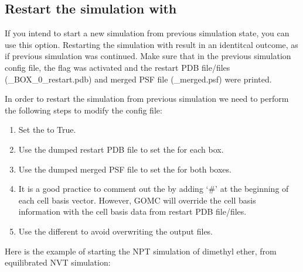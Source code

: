 \documentclass[letterpaper,10pt,english]{sphinxmanual}
\begin{document}
\subsection{Restart the simulation with }
\label{\detokenize{howto:restart-the-simulation-with-restart}}
If you intend to start a new simulation from previous simulation state, you can use this option. Restarting the simulation with   result in
an identitcal outcome, as if previous simulation was continued.
Make sure that in the previous simulation config file, the flag  was activated and the restart PDB file/files (\_BOX\_0\_restart.pdb)
and merged PSF file (\_merged.psf) were printed.

In order to restart the simulation from previous simulation we need to perform the following steps to modify the config file:
\begin{enumerate}
%
\item {} 
Set the  to True.

\item {} 
Use the dumped restart PDB file to set the  for each box.

\item {} 
Use the dumped merged PSF file to set the  for both boxes.

\item {} 
It is a good practice to comment out the  by adding ‘\#’ at the beginning of each cell basis vector. However, GOMC will override
the cell basis information with the cell basis data from restart PDB file/files.

\item {} 
Use the different  to avoid overwriting the output files.

\end{enumerate}

Here is the example of starting the NPT simulation of dimethyl ether, from equilibrated NVT simulation:
\end{document}

